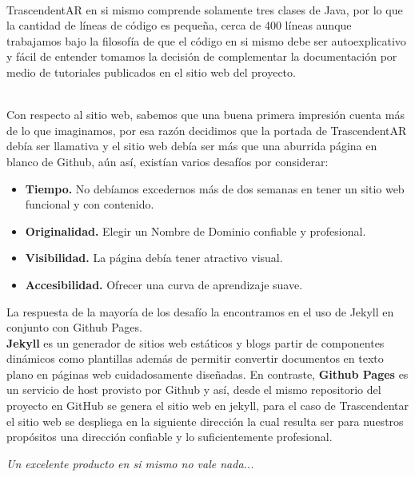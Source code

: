 \begin{multicols}{2}

\\
TrascendentAR en si mismo comprende solamente tres clases de Java, por lo que la cantidad de líneas de código es pequeña, cerca de 400 líneas aunque trabajamos bajo la filosofía de que el código en si mismo debe ser autoexplicativo y fácil de entender tomamos la decisión de complementar la documentación por medio de tutoriales publicados en el sitio web del proyecto.


\\
Con respecto al sitio web, sabemos que una buena primera impresión cuenta más de lo que imaginamos, por esa razón decidimos que la portada de TrascendentAR debía ser llamativa y el sitio web debía ser más que una aburrida página en blanco de Github, aún así, existían varios desafíos por considerar:

\begin{itemize}
    \item \textbf {Tiempo.} No debíamos excedernos más de dos semanas en tener un sitio web funcional y con contenido.
    \item \textbf {Originalidad.} Elegir un Nombre de Dominio confiable y profesional.
    \item \textbf {Visibilidad.} La página debía tener atractivo visual.
    \item \textbf {Accesibilidad.} Ofrecer una curva de aprendizaje suave.
    
\end{itemize}

La respuesta de la mayoría de los desafío la encontramos en el uso de Jekyll en conjunto con Github Pages.
\\

\textbf {Jekyll} es un generador de sitios web estáticos y blogs partir de componentes dinámicos como plantillas además de permitir convertir documentos en texto plano en páginas web cuidadosamente diseñadas. En contraste, \textbf {Github Pages} es un servicio de host provisto por Github y así, desde el mismo repositorio del proyecto en GitHub se genera el sitio web en jekyll, para el caso de Trascendentar el sitio web se despliega en la siguiente dirección  {\color{introcolor}{glud.github.io/trascendentAR}} la cual resulta ser para nuestros propósitos una dirección confiable y lo suficientemente profesional.
\\ 
\begin{entradilla}
{\em Un excelente producto en si mismo no vale nada... {\color{introcolor}{si nadie lo conoce}} }
\end{entradilla}
\\


\end{multicols}
